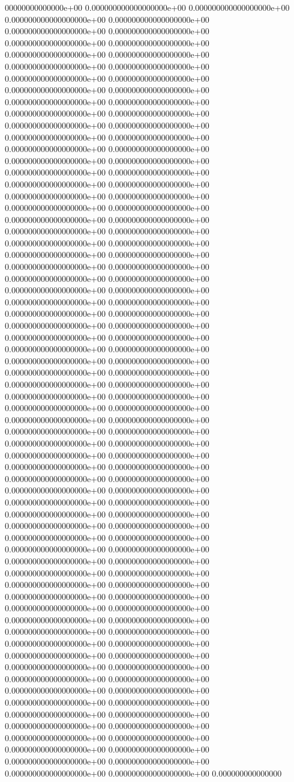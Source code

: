 00000000000000e+00	0.000000000000000000e+00	0.000000000000000000e+00	0.000000000000000000e+00	0.000000000000000000e+00	0.000000000000000000e+00	0.000000000000000000e+00	0.000000000000000000e+00	0.000000000000000000e+00	0.000000000000000000e+00	0.000000000000000000e+00	0.000000000000000000e+00	0.000000000000000000e+00	0.000000000000000000e+00	0.000000000000000000e+00	0.000000000000000000e+00	0.000000000000000000e+00	0.000000000000000000e+00	0.000000000000000000e+00	0.000000000000000000e+00	0.000000000000000000e+00	0.000000000000000000e+00	0.000000000000000000e+00	0.000000000000000000e+00	0.000000000000000000e+00	0.000000000000000000e+00	0.000000000000000000e+00	0.000000000000000000e+00	0.000000000000000000e+00	0.000000000000000000e+00	0.000000000000000000e+00	0.000000000000000000e+00	0.000000000000000000e+00	0.000000000000000000e+00	0.000000000000000000e+00	0.000000000000000000e+00	0.000000000000000000e+00	0.000000000000000000e+00	0.000000000000000000e+00	0.000000000000000000e+00	0.000000000000000000e+00	0.000000000000000000e+00	0.000000000000000000e+00	0.000000000000000000e+00	0.000000000000000000e+00	0.000000000000000000e+00	0.000000000000000000e+00	0.000000000000000000e+00	0.000000000000000000e+00	0.000000000000000000e+00	0.000000000000000000e+00	0.000000000000000000e+00	0.000000000000000000e+00	0.000000000000000000e+00	0.000000000000000000e+00	0.000000000000000000e+00	0.000000000000000000e+00	0.000000000000000000e+00	0.000000000000000000e+00	0.000000000000000000e+00	0.000000000000000000e+00	0.000000000000000000e+00	0.000000000000000000e+00	0.000000000000000000e+00	0.000000000000000000e+00	0.000000000000000000e+00	0.000000000000000000e+00	0.000000000000000000e+00	0.000000000000000000e+00	0.000000000000000000e+00	0.000000000000000000e+00	0.000000000000000000e+00	0.000000000000000000e+00	0.000000000000000000e+00	0.000000000000000000e+00	0.000000000000000000e+00	0.000000000000000000e+00	0.000000000000000000e+00	0.000000000000000000e+00	0.000000000000000000e+00	0.000000000000000000e+00	0.000000000000000000e+00	0.000000000000000000e+00	0.000000000000000000e+00	0.000000000000000000e+00	0.000000000000000000e+00	0.000000000000000000e+00	0.000000000000000000e+00	0.000000000000000000e+00	0.000000000000000000e+00	0.000000000000000000e+00	0.000000000000000000e+00	0.000000000000000000e+00	0.000000000000000000e+00	0.000000000000000000e+00	0.000000000000000000e+00	0.000000000000000000e+00	0.000000000000000000e+00	0.000000000000000000e+00	0.000000000000000000e+00	0.000000000000000000e+00	0.000000000000000000e+00	0.000000000000000000e+00	0.000000000000000000e+00	0.000000000000000000e+00	0.000000000000000000e+00	0.000000000000000000e+00	0.000000000000000000e+00	0.000000000000000000e+00	0.000000000000000000e+00	0.000000000000000000e+00	0.000000000000000000e+00	0.000000000000000000e+00	0.000000000000000000e+00	0.000000000000000000e+00	0.000000000000000000e+00	0.000000000000000000e+00	0.000000000000000000e+00	0.000000000000000000e+00	0.000000000000000000e+00	0.000000000000000000e+00	0.000000000000000000e+00	0.000000000000000000e+00	0.000000000000000000e+00	0.000000000000000000e+00	0.000000000000000000e+00	0.000000000000000000e+00	0.000000000000000000e+00	0.000000000000000000e+00	0.000000000000000000e+00	0.000000000000000000e+00	0.000000000000000000e+00	0.000000000000000000e+00	0.000000000000000
